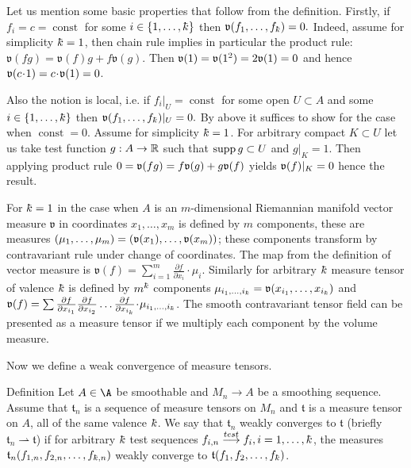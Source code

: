 \documentclass[a4paper,10pt]{article}
\begin{document}
Let us mention some basic properties that follow 
from the definition.
Firstly, if $f_i=c=\operatorname{const}$  for some $i\in\{1,\dots,\kay\}$ 
then $\mathfrak{v}(f_1,\dots,f_\kay)=0.$
Indeed, assume for simplicity  $\kay=1$, then
chain rule implies in particular the
product rule:
$\mathfrak{v}(fg)=\mathfrak{v}(f)g+f\mathfrak{v}(g)$.
Then $\mathfrak{v}(1)=\mathfrak{v}(1^2)=2\mathfrak{v}(1)=0$ and hence
$\vv(c\cdot 1)=c\cdot\vv(1)=0$.



Also the notion is local,
i.e. if $f_i|_{U}=\operatorname{const}$
for some open $U\subset A$ and some $i\in\{1,\dots,\kay\}$ 
 then $\mathfrak{v}(f_1,\dots,f_\kay)|_U=0.$
By above it suffices to show
for the case when $\operatorname{const}=0$.
Assume for simplicity  $\kay=1$. 
For arbitrary compact $K\subset U$  let
us take test function $g:A\to\mathbb{R}$ such that
$\operatorname{supp} g\subset U$ and $g|_K=1$. Then applying product rule
 $0=\mathfrak{v}(fg)=f\mathfrak{v}(g)+g\mathfrak{v}(f)$ yields 
$\mathfrak{v}(f)|_K=0$ hence 
 the result.
 
For $\kay=1$ in the case when $A$ is an $m$-dimensional Riemannian manifold 
 vector measure $\mathfrak{v}$  in coordinates
 $x_1,\dots,x_m$
is defined by $m$ components, these are measures $(\mu_1,\dots, \mu_{m})=(\mathfrak{v}(x_1),\dots,\mathfrak{v}(x_m))$;
these components transform by contravariant rule under change
 of coordinates. The map from the definition of vector measure is
 $\mathfrak{v}(f)=\sum_{i=1}^m\frac{\partial f}{\partial x_i}\cdot \mu_i$.
 Similarly for arbitrary $\kay$
 measure tensor of valence $\kay$ 
 is defined by $m^\kay$ components 
 $\mu_{{i_1},\dots,{i_\kay}}=\vv(x_{i_1},\dots,x_{i_\kay})$
 and
 $\mathfrak{v}(f)=\sum
 \frac{\partial f}{\partial x_{i_1}}\frac{\partial f}{\partial x_{i_2}}\dots\frac{\partial f}{\partial x_{i_k}}
 \cdot \mu_{{i_1},\dots,{i_\kay}}$.
 The smooth contravariant tensor field
 can be presented as a measure tensor
 if we multiply each component by the volume measure.



Now we define a weak convergence of measure tensors.

\begin{rdef} {Definition}
	Let $A\in \A$ be smoothable and $M_n\to A$ be a
	smoothing sequence.
Assume that $\mathfrak{t}_n$ is a sequence of %
 measure tensors on $M_n$  and $\mathfrak{t}$ is a
measure tensor on $A$,
all of the same valence $\kay$.
We say that $\mathfrak{t}_n$ weakly converges to  $\mathfrak{t}$
(briefly $\mathfrak{t}_n\rightharpoonup\mathfrak{t}$) if for arbitrary $\kay$
test sequences 
$f_{i,n}\testto f_i, i=1,\dots,\kay$, the measures $\mathfrak{t}_n(f_{1,n},f_{2,n},\dots,f_{\kay,n})$ weakly converge to $\mathfrak{t}(f_{1},f_{2},\dots,f_{\kay})$.
\end{rdef}
\end{document}
